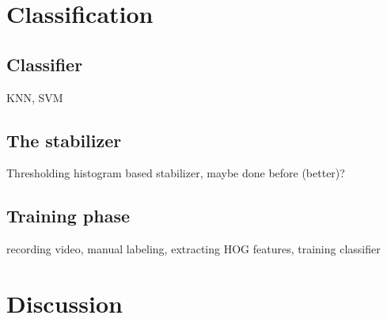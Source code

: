 \section{Classification}

\subsection*{Classifier}
KNN,  SVM

\subsection*{The stabilizer}
Thresholding histogram based stabilizer, maybe done before (better)?

\subsection*{Training phase}
recording video, manual labeling, extracting HOG features, training classifier

\section{Discussion}
